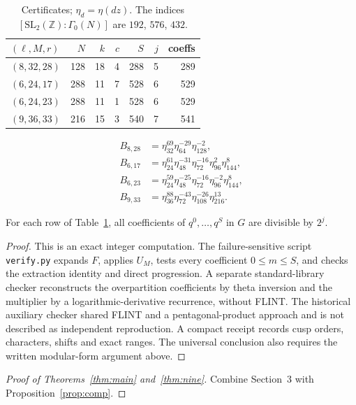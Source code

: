 \documentclass[11pt]{article}
\theoremstyle{remark}\newtheorem{remark}[theorem]{Remark}
\begin{document}
\begin{table}[h]\centering\small
\begin{tabular}{@{}lrrrrrr@{}}\toprule
$(\ell,M,r)$ & $N$ & $k$ & $c$ & $S$ & $j$ & coeffs\\\midrule
$(8,32,28)$ & 128 & 18 & 4 & 288 & 5 & 289\\
$(6,24,17)$ & 288 & 11 & 7 & 528 & 6 & 529\\
$(6,24,23)$ & 288 & 11 & 1 & 528 & 6 & 529\\
$(9,36,33)$ & 216 & 15 & 3 & 540 & 7 & 541\\\bottomrule
\end{tabular}
\[\begin{aligned}
B_{8,28}&=\eta_{32}^{69}\eta_{64}^{-29}\eta_{128}^{-2},\\
B_{6,17}&=\eta_{24}^{61}\eta_{48}^{-31}\eta_{72}^{-16}\eta_{96}^{2}\eta_{144}^{8},\\
B_{6,23}&=\eta_{24}^{59}\eta_{48}^{-25}\eta_{72}^{-16}\eta_{96}^{-2}\eta_{144}^{8},\\
B_{9,33}&=\eta_{36}^{88}\eta_{72}^{-43}\eta_{108}^{-26}\eta_{216}^{13}.
\end{aligned}\]
\caption{Certificates; $\eta_d=\eta(dz)$. The indices $[\mathrm{SL}_2(\mathbb Z):\Gamma_0(N)]$ are $192$, $576$, $432$.}\label{tab:cert}
\end{table}

\begin{proposition}\label{prop:comp}
For each row of Table~\ref{tab:cert}, all coefficients of $q^0,\dots,q^S$ in $G$ are divisible by $2^j$.
\end{proposition}
\begin{proof}
This is an exact integer computation. The failure-sensitive script \texttt{verify.py} expands $F$, applies $U_M$, tests every coefficient $0\le m\le S$, and checks the extraction identity and direct progression. A separate standard-library checker reconstructs the overpartition coefficients by theta inversion and the multiplier by a logarithmic-derivative recurrence, without FLINT. The historical auxiliary checker shared FLINT and a pentagonal-product approach and is not described as independent reproduction. A compact receipt records cusp orders, characters, shifts and exact ranges. The universal conclusion also requires the written modular-form argument above.
\end{proof}

\begin{proof}[Proof of Theorems~\ref{thm:main} and~\ref{thm:nine}]
Combine Section~3 with Proposition~\ref{prop:comp}.
\end{proof}
\end{document}
